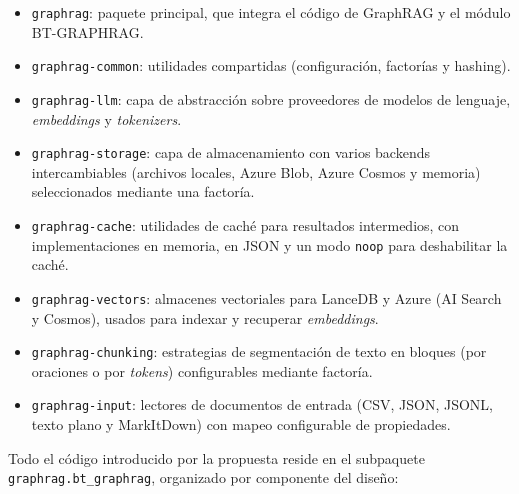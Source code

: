 \begin{itemize}
  \item \texttt{graphrag}: paquete principal, que integra el código de GraphRAG y el módulo BT-GRAPHRAG.
  \item \texttt{graphrag-common}: utilidades compartidas (configuración, factorías y hashing).
  \item \texttt{graphrag-llm}: capa de abstracción sobre proveedores de modelos de lenguaje, \emph{embeddings} y \emph{tokenizers}.
  \item \texttt{graphrag-storage}: capa de almacenamiento con varios backends intercambiables (archivos locales, Azure Blob, Azure Cosmos y memoria) seleccionados mediante una factoría.
  \item \texttt{graphrag-cache}: utilidades de caché para resultados intermedios, con implementaciones en memoria, en JSON y un modo \texttt{noop} para deshabilitar la caché.
  \item \texttt{graphrag-vectors}: almacenes vectoriales para LanceDB y Azure (AI Search y Cosmos), usados para indexar y recuperar \emph{embeddings}.
  \item \texttt{graphrag-chunking}: estrategias de segmentación de texto en bloques (por oraciones o por \emph{tokens}) configurables mediante factoría.
  \item \texttt{graphrag-input}: lectores de documentos de entrada (CSV, JSON, JSONL, texto plano y MarkItDown) con mapeo configurable de propiedades.
\end{itemize}

Todo el código introducido por la propuesta reside en el subpaquete \texttt{graphrag.bt\_graphrag}, organizado por componente del diseño:

